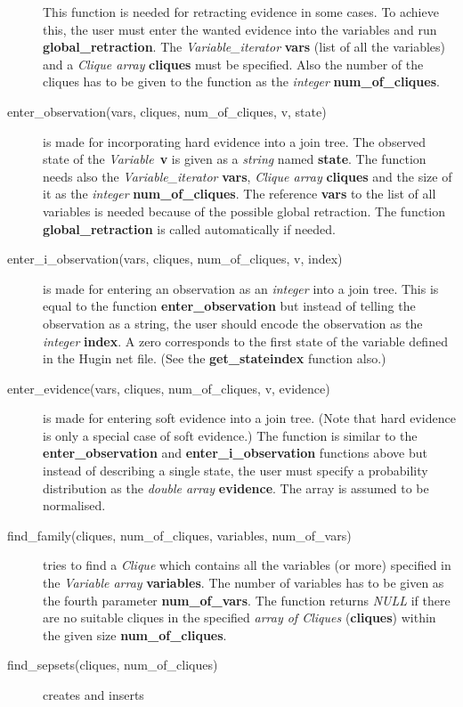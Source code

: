 \documentclass[12pt,a4paper]{report}
\begin{document}
\begin{description}
This function is needed for retracting evidence in some cases. To
achieve this, the user must enter the wanted evidence into the
variables and run \textbf{global\_retraction}. The 
{\it Variable\_iterator} \textbf{vars} (list of all the variables) and 
a {\it Clique array} \textbf{cliques} must be specified. Also the
number of the cliques has to be given to the function as the {\it
integer} \textbf{num\_of\_cliques}.
\item[enter\_observation(vars, cliques, num\_of\_cliques, v, state)] 
is made for incorporating hard evidence into a join tree. The observed
state of the {\it Variable}~\textbf{v} is given as a {\it string} named
\textbf{state}. The function needs also the {\it Variable\_iterator}
\textbf{vars}, {\it Clique array} \textbf{cliques} and the size of it
as the {\it integer} \textbf{num\_of\_cliques}. The reference
\textbf{vars} to the list of all variables is needed because of the
possible global retraction. The function \textbf{global\_retraction}
is called automatically if needed.
\item[enter\_i\_observation(vars, cliques, num\_of\_cliques, v, index)]
is made for entering an observation as an {\it integer} into a join
tree. This is equal to the function \textbf{enter\_observation} but
instead of telling the observation as a string, the user should encode
the observation as the {\it integer} \textbf{index}. A zero
corresponds to the first state of the variable defined in the Hugin
net file. (See the \textbf{get\_stateindex} function also.)
\item[enter\_evidence(vars, cliques, num\_of\_cliques, v, evidence)]
is made for entering soft evidence into a join tree. (Note that hard
evidence is only a special case of soft evidence.) The function is
similar to the \textbf{enter\_observation} and
\textbf{enter\_i\_observation} functions above but instead of
describing a single state, the user must specify a probability
distribution as the {\it double array} \textbf{evidence}. The array is
assumed to be normalised.
\item[find\_family(cliques, num\_of\_cliques, variables, num\_of\_vars)]
tries to find a {\it Clique} which contains all the variables (or
more) specified in the {\it Variable array} \textbf{variables}. The 
number of variables has to be given as the fourth parameter 
\textbf{num\_of\_vars}. The function returns {\it NULL} if there are
no suitable cliques in the specified {\it array of Cliques} 
(\textbf{cliques}) within the given size \textbf{num\_of\_cliques}.
\item[find\_sepsets(cliques, num\_of\_cliques)] creates and inserts 

\end{description}
\end{document}
